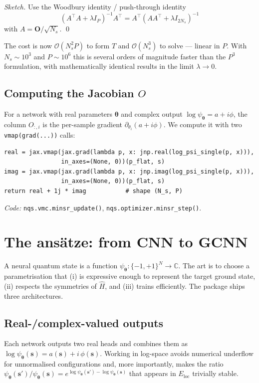 \documentclass[11pt,a4paper]{article}
\newcommand{\C}{\mathbb{C}}
\newcommand{\bs}{\bm{s}}
\newcommand{\btheta}{\bm{\theta}}
\newcommand{\Hop}{\hat{H}}
\newcommand{\psip}{\psi_{\btheta}}
\newcommand{\Eloc}{E_{\mathrm{loc}}}
\theoremstyle{definition}
\theoremstyle{plain}
\begin{document}
\begin{proof}[Sketch]
Use the Woodbury identity / push-through identity
\begin{equation}
   (A^{\!\top}\!A + \lambda I_{P})^{-1} A^{\!\top}
   = A^{\!\top} (A A^{\!\top} + \lambda I_{2N_{s}})^{-1}
\end{equation}
with $A = \mathbf O / \sqrt{N_{s}}$. \qed
\end{proof}

The cost is now $\mathcal O(N_{s}^{2} P)$ to form $T$ and
$\mathcal O(N_{s}^{3})$ to solve --- linear in $P$. With
$N_{s} \sim 10^{3}$ and $P \sim 10^{6}$ this is several orders of magnitude
faster than the $P^{3}$ formulation, with mathematically identical results
in the limit $\lambda\to 0$.

\subsection{Computing the Jacobian \texorpdfstring{$O$}{O}}

For a network with real parameters $\btheta$ and complex output
$\log\psip = a + i\phi$, the column $O_{:,i}$ is the per-sample gradient
$\partial_{\theta_{i}}(a + i\phi)$. We compute it with two
\texttt{vmap(grad(...))} calls:
\begin{lstlisting}
real = jax.vmap(jax.grad(lambda p, x: jnp.real(log_psi_single(p, x))),
                in_axes=(None, 0))(p_flat, s)
imag = jax.vmap(jax.grad(lambda p, x: jnp.imag(log_psi_single(p, x))),
                in_axes=(None, 0))(p_flat, s)
return real + 1j * imag           # shape (N_s, P)
\end{lstlisting}

\smallskip
\noindent\textit{Code:} \texttt{nqs.vmc.minsr\_update()},
\texttt{nqs.optimizer.minsr\_step()}.

\section{The ansätze: from CNN to GCNN}

A neural quantum state is a function $\psip : \{-1,+1\}^N \to \C$. The art is
to choose a parametrisation that (i) is expressive enough to represent the
target ground state, (ii) respects the symmetries of $\Hop$, and (iii)
trains efficiently. The package ships three architectures.

\subsection{Real-/complex-valued outputs}
Each network outputs two real heads and combines them as
$\log\psip(\bs) = a(\bs) + i\,\phi(\bs)$. Working in log-space avoids
numerical underflow for unnormalised configurations and, more importantly,
makes the ratio $\psip(\bs')/\psip(\bs) = e^{\log\psip(\bs') - \log\psip(\bs)}$
that appears in $\Eloc$ trivially stable.
\end{document}
